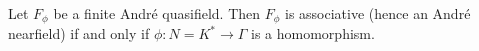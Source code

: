 Let $F_\phi$ be a finite André quasifield. Then $F_\phi$ is associative (hence an André nearfield) if and only if $\phi: N = K^* \to \Gamma$ is a homomorphism.